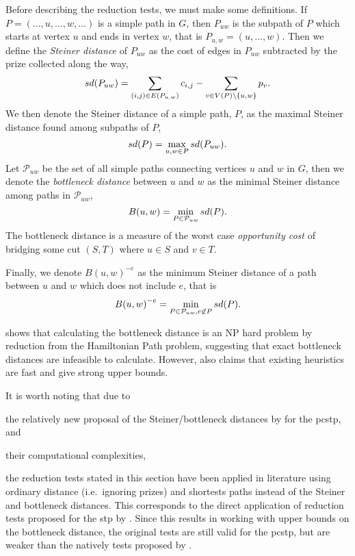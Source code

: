 Before describing the reduction tests, we must make some definitions.
If $P = (\ldots, u, \ldots, w, \ldots)$ is a simple path in $G$, then $P_{uw}$ is
the subpath of $P$ which starts at vertex $u$ and ends in vertex $w$,
that is $P_{u,w} = (u, \ldots,w)$. Then we define the \textit{Steiner distance} of
$P_{uw}$ as the cost of edges in $P_{uw}$ subtracted by the prize collected along
 the way,
 $$sd(P_{uw}) = \sum_{(i,j) \in E(P_{u,w})} c_{i,j} -
 \sum_{v \in V(P) \setminus \{u,w\}} p_{v}\mathnormal{.}$$
 We then denote the Steiner distance of a simple path, $P$, as the maximal Steiner
 distance found among subpaths of $P$,
 \[sd(P) = \max_{u,w \in P} sd(P_{uw})\mathnormal{.}\]
 Let $\mathcal{P}_{uw}$ be the set of all simple paths
 connecting vertices $u$ and $w$ in
 $G$, then we denote the \textit{bottleneck distance} between $u$ and $w$ as the minimal Steiner
  distance among paths in $\mathcal{P}_{uw}$,
  \[B(u,w) = \min_{P \in  \mathcal{P}_{uw}} sd(P)\mathnormal{.}\]
  The bottleneck distance is a measure of the worst case \textit{opportunity cost}
 of bridging some cut $(S, T)$
 where $u \in S$ and $v \in T$.

 Finally, we denote ${B(u,w)}^{-e}$
 as the minimum Steiner distance of a path between $u$ and $w$ which does
   not include $e$, that is
  \[{B(u,w)}^{-e} = \min_{P \in  \mathcal{P}_{uw}, e \not \in P} sd(P)\mathnormal{.}\]

 \citet{uchoa2006reduction} shows that calculating the bottleneck distance
 is an NP hard problem by reduction from the Hamiltonian Path problem, suggesting that
 exact bottleneck distances are infeasible to calculate. However, \citet{uchoa2006reduction}
 also claims that existing heuristics are fast and give strong upper bounds.

It is worth noting that due to
\begin{enumerate*}[label={\alph*)}]
\item the relatively new proposal of the Steiner/bottleneck distances by \citet{uchoa2006reduction} for the \gls{pcstp}, and
\item their computational complexities,
\end{enumerate*}
the reduction tests stated in this section have been applied in literature
using ordinary distance (i.e.\ ignoring prizes) and shortests paths
instead of the Steiner and bottleneck distances. This corresponds to the direct application of
reduction tests
proposed for the \gls{stp} by \citet{duin1989edge,duin1989reduction}. Since this results in
working with
upper bounds on the bottleneck distance, the original
tests are still valid for the \gls{pcstp},
but are weaker than the natively tests proposed by \citet{uchoa2006reduction}.

